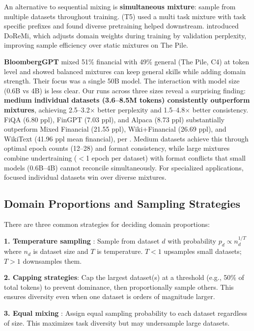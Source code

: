 An alternative to sequential mixing is \textbf{simultaneous mixture}: sample from multiple datasets throughout training. \textcite{raffel2020exploring} (T5) used a multi task mixture with task specific prefixes and found diverse pretraining helped downstream. \textcite{xie2023doremi} introduced DoReMi, which adjusts domain weights during training by validation perplexity, improving sample efficiency over static mixtures on The Pile.

\textbf{BloombergGPT} \parencite{wu2023bloomberggpt} mixed 51\% financial with 49\% general (The Pile, C4) at token level and showed balanced mixtures can keep general skills while adding domain strength. Their focus was a single 50B model. The interaction with model size (0.6B vs 4B) is less clear. Our runs across three sizes reveal a surprising finding: \textbf{medium individual datasets (3.6–8.5M tokens) consistently outperform mixtures}, achieving 2.5–3.2$\times$ better perplexity and 1.5–4.8$\times$ better consistency. FiQA (6.80 ppl), FinGPT (7.03 ppl), and Alpaca (8.73 ppl) substantially outperform Mixed Financial (21.55 ppl), Wiki+Financial (26.69 ppl), and WikiText (41.96 ppl mean financial), per . Medium datasets achieve this through optimal epoch counts (12–28) and format consistency, while large mixtures combine undertraining ($<$1 epoch per dataset) with format conflicts that small models (0.6B–4B) cannot reconcile simultaneously. For specialized applications, focused individual datasets win over diverse mixtures.

\subsection{Domain Proportions and Sampling Strategies}

There are three common strategies for deciding domain proportions:

\textbf{1. Temperature sampling} \parencite{arivazhagan2019massively}: Sample from dataset $d$ with probability $p_d \propto n_d^{1/T}$ where $n_d$ is dataset size and $T$ is temperature. $T < 1$ upsamples small datasets; $T > 1$ downsamples them.

\textbf{2. Capping strategies}: Cap the largest dataset(s) at a threshold (e.g., 50\% of total tokens) to prevent dominance, then proportionally sample others. This ensures diversity even when one dataset is orders of magnitude larger.

\textbf{3. Equal mixing} \parencite{sanh2022multitask}: Assign equal sampling probability to each dataset regardless of size. This maximizes task diversity but may undersample large datasets.

